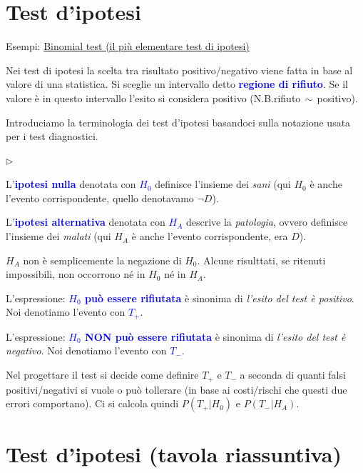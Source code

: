 \documentclass[10pt,openany]{book}
\newcommand{\mylabel}[1]{{\footnotesize\textsf{#1}}\hfill}
\renewenvironment{itemize}
  {\begin{list}{$\triangleright$}{%
   \setlength{\parskip}{0mm}
   \setlength{\topsep}{.2\baselineskip}
   \setlength{\rightmargin}{0mm}
   \setlength{\listparindent}{0mm}
   \setlength{\itemindent}{0mm}
   \setlength{\labelwidth}{3ex}
   \setlength{\itemsep}{.4\baselineskip}
   \setlength{\parsep}{0mm}
   \setlength{\partopsep}{0mm}
   \setlength{\labelsep}{1ex}
   \setlength{\leftmargin}{\labelwidth+\labelsep}
   \let\makelabel\mylabel}}{%
   \end{list}\vspace*{-1.3mm}}
\def\emph#1{\textcolor{blue}{\textbf{\boldmath #1}}}
\theoremstyle{mio}
\theoremstyle{liscio}
\begin{document}
\clearpage\section{Test d'ipotesi}

Esempi: \hyperref[Bernoulli_test]{Binomial test (il più elementare test di ipotesi) \faShare}

Nei test di ipotesi la scelta tra risultato positivo/negativo viene fatta in base al valore di una statistica. Si sceglie un intervallo detto \emph{regione di rifiuto\/}. Se il valore è in questo intervallo l'esito si considera positivo (N.B.\@ rifiuto$\,\sim\,$positivo).

Introduciamo la terminologia dei test d'ipotesi basandoci sulla notazione usata per i test diagnostici.

\begin{itemize}
\item L'\emph{ipotesi nulla\/} denotata con \emph{$H_0$} definisce l'insieme dei \textit{sani\/} (qui $H_0$ è anche l'evento corrispondente, quello denotavamo $\neg D$). 

\item L'\emph{ipotesi alternativa\/} denotata con \emph{$H_A$}  descrive la \textit{patologia}, ovvero definisce l'insieme dei \textit{malati\/} (qui $H_A$ è anche l'evento corrispondente, era $D$).

\item $H_A$ non è semplicemente la negazione di $H_0$. Alcune risulttati, se ritenuti impossibili, non occorrono né in $H_0$ né in $H_A$.

\item L'espressione: \emph{$H_0$ può essere rifiutata\/} è sinonima di \textit{l'esito del test è positivo}. Noi denotiamo l'evento con \emph{$T_+$}.


\item L'espressione: \emph{$H_0$ NON può essere rifiutata\/} è sinonima di \textit{l'esito del test è negativo}. Noi denotiamo l'evento con \emph{$T_-$}.

\item Nel progettare il test si decide come definire $T_+$ e $T_-$ a seconda di quanti falsi positivi/negativi si vuole o può tollerare (in base ai costi/rischi che questi due errori comportano). Ci si calcola quindi $P(T_+|H_0)$ e $P(T_-|H_A)$.
\end{itemize}


\clearpage\section{Test d'ipotesi (tavola riassuntiva)}
\setlength{\fboxsep}{1ex}
\end{document}
